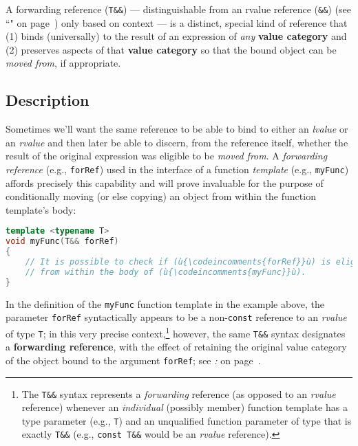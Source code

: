 
A forwarding reference (\texttt{T\&\&}) --- distinguishable from an
rvalue reference (\texttt{\&\&}) (see ``" on page~\pageref{Rvalue-References}) only based on context
--- is a distinct, special kind of reference that (1) binds
(universally) to the result of an expression of \emph{any} \textbf{value
category} and (2) preserves aspects of that \textbf{value category} so
that the bound object can be \emph{moved from}, if appropriate.

\subsection[Description]{Description}\label{description-forwardingref}

Sometimes we'll want the same reference to be able to bind to either an
\emph{lvalue} or an \emph{rvalue} and then later be able to discern,
from the reference itself, whether the result of the original expression
was eligible to be \emph{moved from}. A \emph{forwarding reference}
(e.g., \texttt{forRef}) used in the interface of a function
\emph{template} (e.g., \texttt{myFunc}) affords precisely this
capability and will prove invaluable for the purpose of conditionally
moving (or else copying) an object from within the function template's
body:

\begin{lstlisting}[language=C++]
template <typename T>
void myFunc(T&& forRef)
{
    // It is possible to check if (ù{\codeincomments{forRef}}ù) is eligible to be moved from or not
    // from within the body of (ù{\codeincomments{myFunc}}ù).
}
\end{lstlisting}
    
\noindent In the definition of the \texttt{myFunc} function template in the example above, the
parameter \texttt{forRef} syntactically appears to be a
non-\texttt{const} reference to an \emph{rvalue} of type \texttt{T}; in
this very precise context,{\cprotect\footnote{The \texttt{T\&\&} syntax
represents a \emph{forwarding} reference (as opposed to an
\emph{rvalue} reference) whenever an \emph{individual} (possibly
member) function template has a type parameter (e.g., \texttt{T}) and
an unqualified function parameter of type that is exactly
\texttt{T\&\&} (e.g., \texttt{const}~\texttt{T\&\&} would be an
  \emph{rvalue} reference).}} however, the same \texttt{T\&\&} syntax
designates a \textbf{forwarding reference}, with the effect of retaining
the original value category of the object bound to the argument
\texttt{forRef}; see \textit{: } on page~\pageref{identifying-forwarding-references}.

